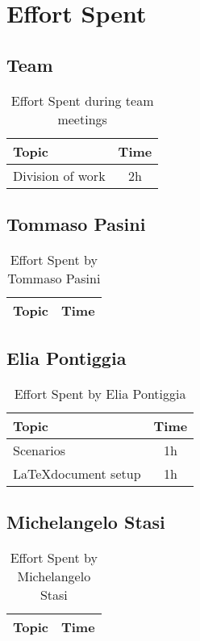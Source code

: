 \chapter{Effort Spent}

\section{Team}


\begin{table}[h]
    \centering
    \begin{tabular}{|l|c|}
        \hline
        \textbf{Topic}   & \textbf{Time} \\ \hline
        Division of work & 2h            \\ \hline
    \end{tabular}
    \caption{Effort Spent during team meetings}
    \label{tab:group-effort-spent}
\end{table}        

\section{Tommaso Pasini}
\begin{table}[h]
    \centering
    \begin{tabular}{|l|c|}
        \hline
        \textbf{Topic} & \textbf{Time} \\ \hline
    \end{tabular}
    \caption{Effort Spent by Tommaso Pasini}
    \label{tab:pasini-effort-spent}
\end{table}

\section{Elia Pontiggia}
\begin{table}[h]
    \centering
    \begin{tabular}{|l|c|}
        \hline
        \textbf{Topic}               & \textbf{Time} \\ \hline
        Scenarios                    & 1h            \\ \hline
        \LaTeX \space document setup & 1h            \\ \hline
    \end{tabular}    
    \caption{Effort Spent by Elia Pontiggia}
    \label{tab:pontiggia-effort-spent}
\end{table}    

\section{Michelangelo Stasi}
\begin{table}[h]
    \centering
    \begin{tabular}{|l|c|}
        \hline
        \textbf{Topic} & \textbf{Time} \\ \hline
    \end{tabular}
    \caption{Effort Spent by Michelangelo Stasi}
    \label{tab:stasi-effort-spent}
\end{table}

